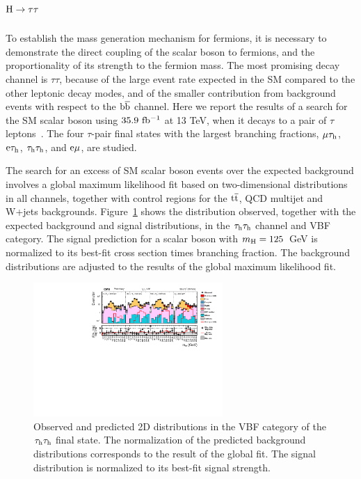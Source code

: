 \documentclass[10pt]{article}
\begin{document}
\section{\boldmath ${\rm H}\to\tau\tau$}

To establish the mass generation mechanism for fermions, it is necessary to
demonstrate the direct coupling of the scalar boson to fermions, and the
proportionality of its strength to the fermion mass. The most promising decay
channel is $\tau\tau$, because of the large event rate expected in the SM
compared to the other leptonic decay modes, and of the smaller contribution
from background events with respect to the ${\rm b\bar{b}}$ channel. Here we
report the results of a search for the SM scalar boson using $35.9~{\rm fb^{-1}}$
at 13 TeV, when it decays to a pair of $\tau$ leptons~\cite{CMS:2017wyg}. The
four $\tau$-pair final states with the largest branching fractions,
$\mu\tau_{\rm h}$, ${\rm e}\tau_{\rm h}$, $\tau_{\rm h}\tau_{\rm h}$, and
${\rm e}\mu$, are studied.


The search for an excess of SM scalar boson events over the expected background
involves a global maximum likelihood fit based on two-dimensional distributions
in all channels, together with control regions for the ${\rm t{\bar t}}$, QCD
multijet and W+jets backgrounds. Figure~\ref{fig:tauhtauh_VBF} shows the
distribution observed, together with the expected background and signal
distributions, in the $\tau_{\rm h}\tau_{\rm h}$ channel and VBF category. The
signal prediction for a scalar boson with $m_{\rm H} = 125$~GeV is
normalized to its best-fit cross section times branching fraction. The background
distributions are adjusted to the results of the global maximum likelihood fit.

\begin{figure}[htb]
\centering
\includegraphics[height=2in]{figures/CMS-HIG-16-043__Figure_013__tauhtauh-VBF.pdf}
\caption{Observed and predicted 2D distributions in the VBF category of the
$\tau_{\rm h}\tau_{\rm h}$ final state. The normalization of the predicted
background distributions corresponds to the result of the global fit. The signal
distribution is normalized to its best-fit signal strength.
}
\label{fig:tauhtauh_VBF}
\end{figure}
\end{document}
